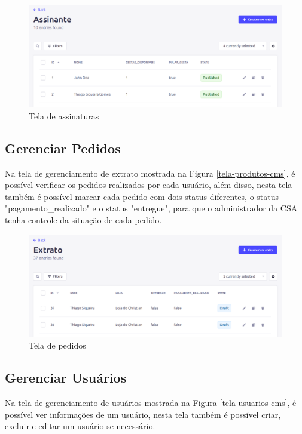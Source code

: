 \begin{figure}[h]
	\centering
	\includegraphics[keepaspectratio=true,scale=0.28]{figuras/painel_assinantes.png}
	\caption{Tela de assinaturas}
        \label{tela-assinaturas-cms}
\end{figure}

\subsection{Gerenciar Pedidos}
Na tela de gerenciamento de extrato mostrada na Figura \ref{tela-produtos-cms}, é possível verificar os pedidos realizados por cada usuário, além disso, nesta tela também é possível marcar cada pedido com dois status diferentes, o status "pagamento\_realizado" e o status "entregue", para que o administrador da CSA tenha controle da situação de cada pedido.

\begin{figure}[h]
	\centering
	\includegraphics[keepaspectratio=true,scale=0.28]{figuras/painel_extrato.png}
	\caption{Tela de pedidos}
        \label{tela-peddos-cms}
\end{figure}

\subsection{Gerenciar Usuários}
Na tela de gerenciamento de usuários mostrada na Figura \ref{tela-usuarios-cms}, é possível ver informações de um usuário, nesta tela também é possível criar, excluir e editar um usuário se necessário.

